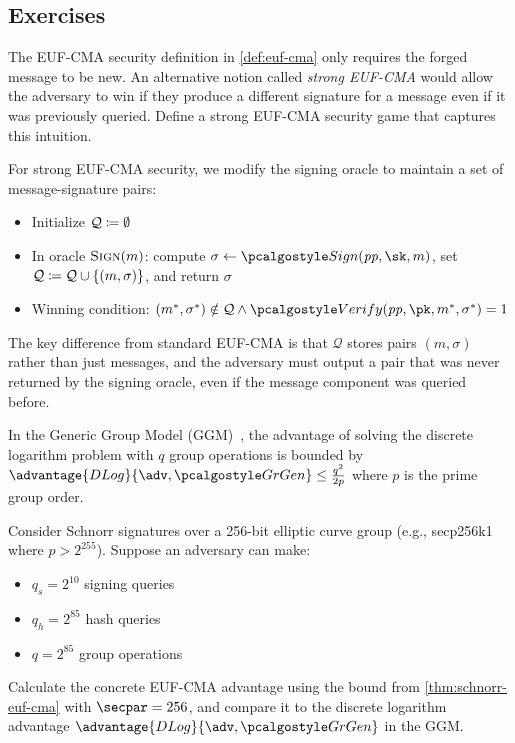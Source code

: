 \subsection{Exercises}

\begin{exercise}
  The EUF-CMA security definition in \autoref{def:euf-cma} only requires the forged message to be new. An alternative notion called \emph{strong EUF-CMA} would allow the adversary to win if they produce a different signature for a message even if it was previously queried. Define a strong EUF-CMA security game that captures this intuition.
\end{exercise}

\ifsolutions
\begin{mysolution}
  For strong EUF-CMA security, we modify the signing oracle to maintain a set of message-signature pairs:
  \begin{itemize}
    \item Initialize $\mathcal{Q} \coloneq \emptyset$
    \item In oracle ${\normalfont\textsc{Sign}}(m)$: compute $\sigma \gets \algo{Sign}(\params, \sk, m)$, set $\mathcal{Q} \coloneq \mathcal{Q} \cup \{(m, \sigma)\}$, and return $\sigma$
    \item Winning condition: $(m^*, \sigma^*) \notin \mathcal{Q} \wedge \algo{Verify}(\params, \pk, m^*, \sigma^*) = 1$
  \end{itemize}

  The key difference from standard EUF-CMA is that $\mathcal{Q}$ stores pairs $(m, \sigma)$ rather than just messages, and the adversary must output a pair that was never returned by the signing oracle, even if the message component was queried before.
\end{mysolution}
\fi


\begin{exercise}
  In the Generic Group Model (GGM)~\cite{EC:Shoup97}, the advantage of solving the discrete logarithm problem with $q$ group operations is bounded by $\advantage{DLog}{\adv, \grgen} \leq \frac{q^2}{2p}$ where $p$ is the prime group order.
  
  Consider Schnorr signatures over a 256-bit elliptic curve group (e.g., secp256k1 where $p > 2^{255}$). Suppose an adversary can make:
  \begin{itemize}
    \item $q_s = 2^{10}$ signing queries
    \item $q_h = 2^{85}$ hash queries
    \item $q = 2^{85}$ group operations
  \end{itemize}
  
  Calculate the concrete EUF-CMA advantage using the bound from \autoref{thm:schnorr-euf-cma} with $\secpar = 256$, and compare it to the discrete logarithm advantage $\advantage{DLog}{\adv, \grgen}$ in the GGM.
\end{exercise}

